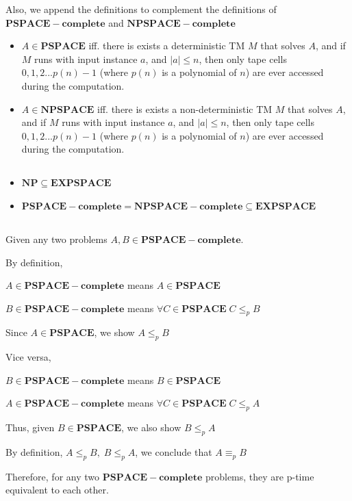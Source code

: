 \documentclass[12pt]{article}
\begin{document}
Also, we append the definitions to complement the definitions of $\pmb{PSPACE-complete}$ and $\pmb{NPSPACE-complete}$
\begin{itemize}
    \item $A \in \pmb{PSPACE}$ iff. there is exists a deterministic TM $M$ that solves $A$, and if $M$ runs with input instance $a$, and $|a| \leq n$, then only tape cells $0,1,2...p(n) - 1$ (where $p(n)$ is a polynomial of $n$) are ever accessed during the computation. 
    \item $A \in \pmb{NPSPACE}$ iff. there is exists a non-deterministic TM $M$ that solves $A$, and if $M$ runs with input instance $a$, and $|a| \leq n$, then only tape cells $0,1,2...p(n) - 1$ (where $p(n)$ is a polynomial of $n$) are ever accessed during the computation. 
\end{itemize}

\subsection{}
\begin{itemize}
    \item $\pmb{NP} \subseteq \pmb{EXPSPACE}$
    \item $\pmb{PSPACE-complete} = \pmb{NPSPACE-complete} \subseteq \pmb{EXPSPACE}$
\end{itemize}

\subsection{}
Given any two problems $A, B \in \pmb{PSPACE-complete}$.

By definition,

$A \in \pmb{PSPACE-complete}$ means $A \in \pmb{PSPACE}$

$B \in \pmb{PSPACE-complete}$ means $\forall C \in \pmb{PSPACE}\; C \leq_p B $

Since $A \in \pmb{PSPACE}$, we show $ A \leq_p B $

Vice versa,

$B \in \pmb{PSPACE-complete}$ means $B \in \pmb{PSPACE}$

$A \in \pmb{PSPACE-complete}$ means $\forall C \in \pmb{PSPACE}\; C \leq_p A $

Thus, given $ B \in \pmb{PSPACE}$, we also show $B \leq_p A$

By definition, $A \leq_p B ,\; B \leq_p A$,  we conclude that $A \equiv_p B $

Therefore, for any two $\pmb{PSPACE-complete}$ problems, they are p-time equivalent to each other.
\end{document}
